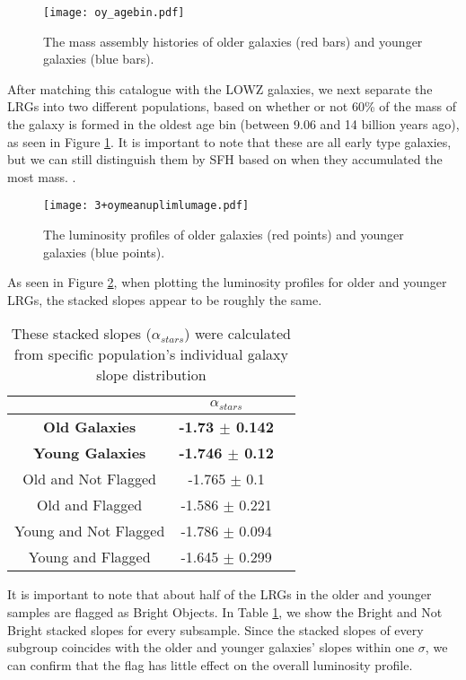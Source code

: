 \documentclass{article}
\begin{document}
\begin{figure}[h!]
\centering
\texttt{[image: oy\_agebin.pdf]}
\caption{The mass assembly histories of older galaxies (red bars) and younger galaxies (blue bars).}
\label{fig:meshba}
\end{figure}

After matching this catalogue with the LOWZ galaxies, we next separate the LRGs into two different populations, based on whether or not 60\% of the mass of the galaxy is formed in the oldest age bin (between 9.06 and 14 billion years ago), as seen in Figure \ref{fig:meshba}. It is important to note that these are all early type galaxies, but we can still distinguish them by SFH based on when they accumulated the most mass. .


\begin{figure}[h!]
\centering
\texttt{[image: 3+oymeanuplimlumage.pdf]}
\caption{The luminosity profiles of older galaxies (red points) and younger galaxies (blue points).}
\label{fig:mesh2}
\end{figure}

As seen in Figure \ref{fig:mesh2}, when plotting the luminosity profiles for older and younger LRGs,  the stacked slopes appear to be roughly the same.

\begin{table}[!htb]
\centering
\begin{tabular}{ccc} \toprule
& \Large{\textbf{\textbf{$\alpha_{stars}$}}}\\ \midrule
\textbf{Old Galaxies} & \textbf{-1.73  $\pm$  0.142}  \\
\textbf{Young Galaxies} & \textbf{-1.746 $\pm$  0.12}\\
Old and Not Flagged & -1.765 $\pm$  0.1 \\
Old and Flagged & -1.586  $\pm$  0.221 \\
Young and Not Flagged & -1.786 $\pm$  0.094 \\
Young and Flagged & -1.645  $\pm$  0.299 \\ \bottomrule
\end{tabular}
\caption{These stacked slopes ($\alpha_{stars}$) were calculated from specific population's individual galaxy slope distribution}
\label{table:3}
\end{table}

It is important to note that about half of the LRGs in the older and younger samples are flagged as Bright Objects. In Table \ref{table:3}, we show the Bright and Not Bright stacked slopes for every subsample. Since the stacked slopes of every subgroup coincides with the older and younger galaxies' slopes within one $\sigma$, we can confirm that the flag has little effect on the overall luminosity profile.
\end{document}
